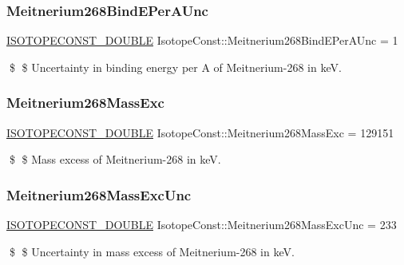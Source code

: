 \subsubsection{\texorpdfstring{Meitnerium268\+Bind\+E\+Per\+A\+Unc}{Meitnerium268BindEPerAUnc}}
{\footnotesize\ttfamily \mbox{\hyperlink{group___isotope_const-_macros_ga8f45a7272ce02c0b4c65c44636ed719a}{I\+S\+O\+T\+O\+P\+E\+C\+O\+N\+S\+T\+\_\+\+D\+O\+U\+B\+LE}} Isotope\+Const\+::\+Meitnerium268\+Bind\+E\+Per\+A\+Unc = 1}

\$ \$ Uncertainty in binding energy per A of Meitnerium-\/268 in keV. \mbox{\label{group___isotope_const-_meitnerium-_mt268_gacdfee199be673947c9ba60fc6cf6bd3f}} 
\subsubsection{\texorpdfstring{Meitnerium268\+Mass\+Exc}{Meitnerium268MassExc}}
{\footnotesize\ttfamily \mbox{\hyperlink{group___isotope_const-_macros_ga8f45a7272ce02c0b4c65c44636ed719a}{I\+S\+O\+T\+O\+P\+E\+C\+O\+N\+S\+T\+\_\+\+D\+O\+U\+B\+LE}} Isotope\+Const\+::\+Meitnerium268\+Mass\+Exc = 129151}

\$ \$ Mass excess of Meitnerium-\/268 in keV. \mbox{\label{group___isotope_const-_meitnerium-_mt268_ga28012e87128ae10bf2c1c7349fc59324}} 
\subsubsection{\texorpdfstring{Meitnerium268\+Mass\+Exc\+Unc}{Meitnerium268MassExcUnc}}
{\footnotesize\ttfamily \mbox{\hyperlink{group___isotope_const-_macros_ga8f45a7272ce02c0b4c65c44636ed719a}{I\+S\+O\+T\+O\+P\+E\+C\+O\+N\+S\+T\+\_\+\+D\+O\+U\+B\+LE}} Isotope\+Const\+::\+Meitnerium268\+Mass\+Exc\+Unc = 233}

\$ \$ Uncertainty in mass excess of Meitnerium-\/268 in keV. \mbox{\label{group___isotope_const-_meitnerium-_mt268_gaae0e448a0f44233b26f6b651b75e6731}} 
